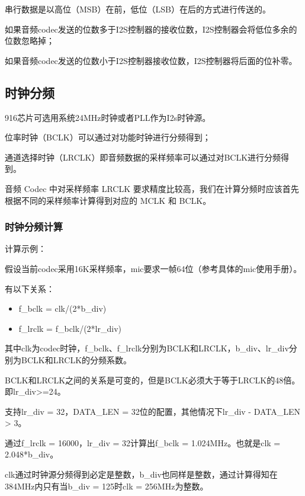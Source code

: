 \documentclass[
  12pt,
]{book}
\begin{document}
串行数据是以高位（MSB）在前，低位（LSB）在后的方式进行传送的。

如果音频codec发送的位数多于I2S控制器的接收位数，I2S控制器会将低位多余的位数忽略掉；

如果音频codec发送的位数小于I2S控制器接收位数，I2S控制器将后面的位补零。

\hypertarget{ux65f6ux949fux5206ux9891}{%
\subsection{时钟分频}\label{ux65f6ux949fux5206ux9891}}

916芯片可选用系统24MHz时钟或者PLL作为I2s时钟源。

位率时钟（BCLK）可以通过对功能时钟进行分频得到；

通道选择时钟（LRCLK）即音频数据的采样频率可以通过对BCLK进行分频得到。

音频 Codec 中对采样频率 LRCLK 要求精度比较高，我们在计算分频时应该首先根据不同的采样频率计算得到对应的 MCLK 和 BCLK。

\hypertarget{ux65f6ux949fux5206ux9891ux8ba1ux7b97}{%
\subsubsection{时钟分频计算}\label{ux65f6ux949fux5206ux9891ux8ba1ux7b97}}

计算示例：

假设当前codec采用16K采样频率，mic要求一帧64位（参考具体的mic使用手册）。

有以下关系：

\begin{itemize}
\item
  f\_bclk = clk/(2*b\_div)
\item
  f\_lrclk = f\_bclk/(2*lr\_div)
\end{itemize}

其中clk为codec时钟，f\_bclk、f\_lrclk分别为BCLK和LRCLK，b\_div、lr\_div分别为BCLK和LRCLK的分频系数。

BCLK和LRCLK之间的关系是可变的，但是BCLK必须大于等于LRCLK的48倍。即lr\_div\textgreater=24。

支持lr\_div = 32，DATA\_LEN = 32位的配置，其他情况下lr\_div - DATA\_LEN \textgreater{} 3。

通过f\_lrclk = 16000，lr\_div = 32计算出f\_bclk = 1.024MHz。也就是clk = 2.048*b\_div。

clk通过时钟源分频得到必定是整数，b\_div也同样是整数，通过计算得知在384MHz内只有当b\_div = 125时clk = 256MHz为整数。
\end{document}
